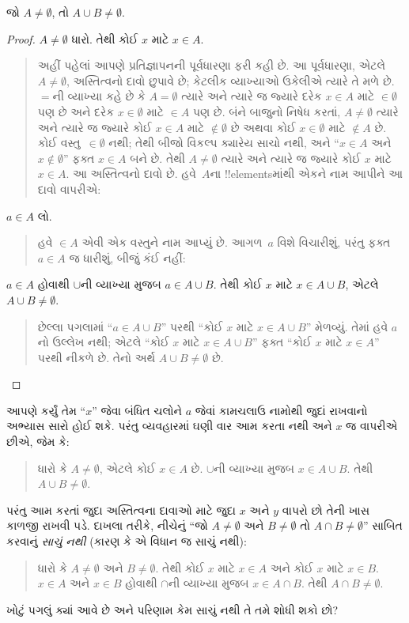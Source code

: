 \documentclass[../../../include/open-logic-section]{subfiles}
\begin{document}
\begin{prop}
જો $A \neq \emptyset$, તો $A \cup B \neq \emptyset$.
\end{prop}

\begin{proof}
  $A \neq \emptyset$ ધારો. તેથી કોઈ $x$ માટે $x \in A$.
  \begin{quote}
    અહીં પહેલાં આપણે પ્રતિજ્ઞાપનની પૂર્વધારણા ફરી કહી છે. આ
    પૂર્વધારણા, એટલે $A \neq \emptyset$, અસ્તિત્વનો દાવો
    છુપાવે છે; કેટલીક વ્યાખ્યાઓ ઉકેલીએ ત્યારે તે મળે છે. $=$ની
    વ્યાખ્યા કહે છે કે $A = \emptyset$ ત્યારે અને ત્યારે જ જ્યારે
    દરેક $x \in A$ માટે $\in \emptyset$ પણ છે અને દરેક $x \in
    \emptyset$ માટે $\in A$ પણ છે. બંને બાજુનો નિષેધ કરતાં,
    $A \neq
    \emptyset$ ત્યારે અને ત્યારે જ જ્યારે કોઈ $x \in A$ માટે
    $\notin \emptyset$ છે અથવા કોઈ $x \in \emptyset$ માટે
    $\notin A$ છે. કોઈ વસ્તુ~$\in \emptyset$ નથી; તેથી બીજો
    વિકલ્પ ક્યારેય સાચો નથી, અને ``$x \in A$ અને $x
    \notin \emptyset$'' ફક્ત $x \in A$ બને છે. તેથી $A \neq
    \emptyset$ ત્યારે અને ત્યારે જ જ્યારે કોઈ $x$ માટે
    $x \in A$. આ અસ્તિત્વનો
    દાવો છે. હવે~$A$ના !!{element}sમાંથી એકને નામ આપીને આ
    દાવો વાપરીએ:
  \end{quote}
  $a \in A$ લો.
  \begin{quote}
    હવે $\in A$ એવી એક વસ્તુને નામ આપ્યું છે. આગળ~$a$
    વિશે વિચારીશું, પરંતુ ફક્ત $a \in A$ જ ધારીશું, બીજું
    કંઈ નહીં:
  \end{quote}
  $a \in A$ હોવાથી $\cup$ની વ્યાખ્યા મુજબ $a \in A \cup B$.
  તેથી કોઈ $x$ માટે $x \in A \cup B$, એટલે $A \cup B \neq \emptyset$.
  \begin{quote}
    છેલ્લા પગલામાં ``$a \in A \cup B$'' પરથી ``કોઈ
    $x$ માટે $x \in A \cup B$'' મેળવ્યું. તેમાં હવે $a$નો
    ઉલ્લેખ નથી; એટલે ``કોઈ $x$ માટે $x \in A \cup B$''
    ફક્ત ``કોઈ $x$ માટે $x \in A$'' પરથી નીકળે છે. તેનો
    અર્થ $A \cup B \neq
    \emptyset$ છે.
  \end{quote}
\end{proof}

આપણે કર્યું તેમ ``$x$'' જેવા બંધિત ચલોને $a$ જેવાં કામચલાઉ
નામોથી જુદાં રાખવાનો અભ્યાસ સારો હોઈ શકે. પરંતુ વ્યવહારમાં
ઘણી વાર આમ કરતા નથી અને $x$ જ વાપરીએ છીએ, જેમ કે:
\begin{quote}
ધારો કે $A \neq \emptyset$, એટલે કોઈ $x \in A$ છે. $\cup$ની
વ્યાખ્યા મુજબ $x \in A \cup B$. તેથી $A \cup B \neq \emptyset$.
\end{quote}
પરંતુ આમ કરતાં જુદા અસ્તિત્વના દાવાઓ માટે જુદા $x$ અને $y$
વાપરો છો તેની ખાસ કાળજી રાખવી પડે. દાખલા તરીકે, નીચેનું
``જો $A \neq
\emptyset$ અને $B \neq \emptyset$ તો $A \cap B \neq \emptyset$''
સાબિત કરવાનું \emph{સાચું નથી} (કારણ કે એ વિધાન જ સાચું નથી):
\begin{quote}
ધારો કે $A \neq \emptyset$ અને $B \neq \emptyset$. તેથી કોઈ $x$ માટે $x
\in A$ અને કોઈ $x$ માટે $x \in B$. $x \in A$ અને $x \in
B$ હોવાથી $\cap$ની વ્યાખ્યા મુજબ $x \in A \cap B$. તેથી $A \cap B \neq
\emptyset$.
\end{quote}
ખોટું પગલું ક્યાં આવે છે અને પરિણામ કેમ સાચું નથી તે તમે
શોધી શકો છો?
\end{document}
